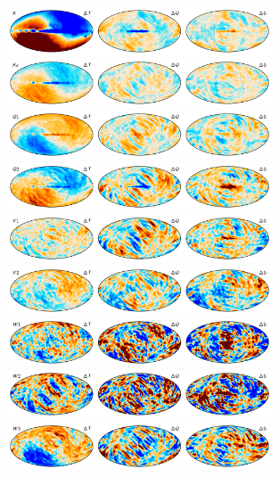 \documentclass[twocolumn]{../../common/aa}
\begin{document}
\begin{figure}
	\centering
	\includegraphics[width=0.7\textwidth]{figures/023-WMAP_K_sampdiff.pdf}
	\includegraphics[width=0.7\textwidth]{figures/030-WMAP_Ka_sampdiff.pdf}
	\includegraphics[width=0.7\textwidth]{figures/040-WMAP_Q1_sampdiff.pdf}
	\includegraphics[width=0.7\textwidth]{figures/040-WMAP_Q2_sampdiff.pdf}
	\includegraphics[width=0.7\textwidth]{figures/060-WMAP_V1_sampdiff.pdf}
	\includegraphics[width=0.7\textwidth]{figures/060-WMAP_V2_sampdiff.pdf}
	\includegraphics[width=0.7\textwidth]{figures/090-WMAP_W1_sampdiff.pdf}
	\includegraphics[width=0.7\textwidth]{figures/090-WMAP_W2_sampdiff.pdf}
	\includegraphics[width=0.7\textwidth]{figures/090-WMAP_W3_sampdiff.pdf}

\end{figure}
\end{document}
